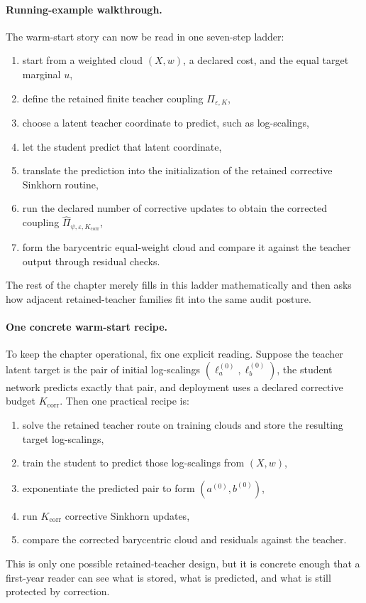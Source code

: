 \paragraph{Running-example walkthrough.}
The warm-start story can now be read in one seven-step ladder:
\begin{enumerate}[label=(\arabic*)]
  \item start from a weighted cloud \((X,w)\), a declared cost, and the equal target
    marginal \(u\),
  \item define the retained finite teacher coupling \(\Pi_{\varepsilon,K}\),
  \item choose a latent teacher coordinate to predict, such as log-scalings,
  \item let the student predict that latent coordinate,
  \item translate the prediction into the initialization of the retained corrective
    Sinkhorn routine,
  \item run the declared number of corrective updates to obtain the corrected
    coupling \(\widehat\Pi_{\psi,\varepsilon,K_{\mathrm{corr}}}\),
  \item form the barycentric equal-weight cloud and compare it against the teacher
    output through residual checks.
\end{enumerate}
The rest of the chapter merely fills in this ladder mathematically and then asks
how adjacent retained-teacher families fit into the same audit posture.

\paragraph{One concrete warm-start recipe.}
To keep the chapter operational, fix one explicit reading.  Suppose the teacher
latent target is the pair of initial log-scalings
\((\ell_a^{(0)},\ell_b^{(0)})\), the student network predicts exactly that pair,
and deployment uses a declared corrective budget \(K_{\mathrm{corr}}\).  Then one
practical recipe is:
\begin{enumerate}[label=(\roman*)]
  \item solve the retained teacher route on training clouds and store the resulting
    target log-scalings,
  \item train the student to predict those log-scalings from \((X,w)\),
  \item exponentiate the predicted pair to form \((a^{(0)},b^{(0)})\),
  \item run \(K_{\mathrm{corr}}\) corrective Sinkhorn updates,
  \item compare the corrected barycentric cloud and residuals against the teacher.
\end{enumerate}
This is only one possible retained-teacher design, but it is concrete enough that a
first-year reader can see what is stored, what is predicted, and what is still
protected by correction.

